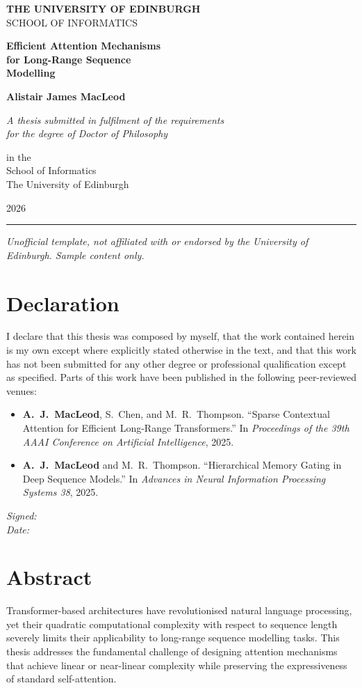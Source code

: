 \documentclass[12pt,a4paper,oneside]{book}
\newcommand{\parsp}[1]{\medskip\noindent#1\medskip}
\newcommand{\makethesistitle}{
  \thispagestyle{empty}
  \begin{center}
    \vspace*{30mm}

    {\LARGE\bfseries\color{edinburghblue}THE UNIVERSITY OF EDINBURGH}\\[6mm]
    {\large\color{edinburghblue!80}SCHOOL OF INFORMATICS}

    \vspace{30mm}

    {\Huge\bfseries\color{edinburghblue}
    Efficient Attention Mechanisms\\[4mm]
    for Long-Range Sequence\\[4mm]
    Modelling}

    \vspace{25mm}

    {\Large\color{edinburghblue!85}\textbf{Alistair James MacLeod}}

    \vspace{15mm}

    {\large\itshape
    A thesis submitted in fulfilment of the requirements\\
    for the degree of Doctor of Philosophy}

    \vspace{15mm}

    {\large
    in the\\
    School of Informatics\\
    The University of Edinburgh}

    \vspace{22mm}

    {\large 2026}

    \vspace{8mm}
    {\color{saltireblue}\rule{60mm}{0.5pt}}

    \vspace{6mm}
    {\footnotesize\itshape Unofficial template, not affiliated with or endorsed by the University of Edinburgh. Sample content only.}

    \vfill
  \end{center}
  \cleardoublepage
}
\begin{document}
\frontmatter

\makethesistitle

\chapter*{Declaration}
\thispagestyle{plain}
\vspace*{10mm}

I declare that this thesis was composed by myself, that the work contained herein is my own
except where explicitly stated otherwise in the text, and that this work has not been submitted
for any other degree or professional qualification except as specified. Parts of this work have
been published in the following peer-reviewed venues:

\begin{itemize}
  \item \textbf{A.\ J.\ MacLeod}, S.\ Chen, and M.\ R.\ Thompson. ``Sparse Contextual Attention
    for Efficient Long-Range Transformers.'' In \textit{Proceedings of the 39th AAAI Conference
    on Artificial Intelligence}, 2025.
  \item \textbf{A.\ J.\ MacLeod} and M.\ R.\ Thompson. ``Hierarchical Memory Gating in Deep
    Sequence Models.'' In \textit{Advances in Neural Information Processing Systems 38}, 2025.
\end{itemize}

\vspace{20mm}
\noindent\textit{Signed:} \hrulefill\\[4mm]
\noindent\textit{Date:} \hrulefill

\cleardoublepage

\chapter*{Abstract}
\thispagestyle{plain}

\parsp{
  Transformer-based architectures have revolutionised natural language processing, yet their
  quadratic computational complexity with respect to sequence length severely limits their
  applicability to long-range sequence modelling tasks. This thesis addresses the fundamental
  challenge of designing attention mechanisms that achieve linear or near-linear complexity while
  preserving the expressiveness of standard self-attention.
}
\end{document}
